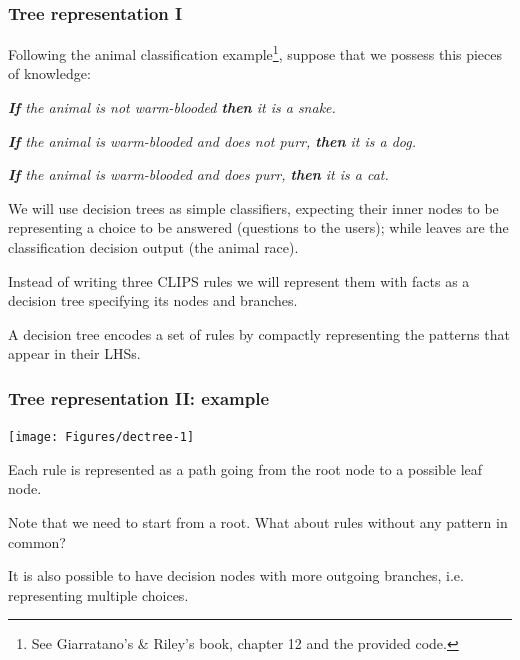 \documentclass[xcolor={usenames,dvipsnames,svgnames}, compress]{beamer}
\begin{document}
\begin{frame}
  \frametitle{Tree representation I}
  
  Following the animal classification example\footnote{See
    Giarratano's \& Riley's book, chapter 12 and the provided code.},
  suppose that we possess this pieces of knowledge:\par\bigskip
  \emph{\textbf{If} the animal is not warm-blooded \textbf{then} it is a snake.}\par
  \emph{\textbf{If} the animal is warm-blooded and does not purr, \textbf{then} it is a dog.}\par
  \emph{\textbf{If} the animal is warm-blooded and does purr, \textbf{then} it is a cat.}\par\bigskip

  We will use decision trees as simple classifiers, expecting their
  inner nodes to be representing a choice to be answered (questions to
  the users); while leaves are the classification decision
  output (the animal race).\par\bigskip

  Instead of writing three CLIPS rules we will represent them with
  facts as a decision tree specifying its nodes and branches.\par
  A decision tree encodes a set of rules by compactly representing the
  patterns that appear in their LHSs.
  
\end{frame}

\begin{frame}
  \frametitle{Tree representation II: example}
  \begin{center}
    \texttt{[image: Figures/dectree-1]}
  \end{center}
  Each rule is represented as a path going from the root node to a
  possible leaf node.\par
  Note that we need to start from a root. What about rules without
  any pattern in common?\par\bigskip
  
  It is also possible to have decision nodes with more outgoing
  branches, i.e. representing multiple choices.
\end{frame}
\end{document}
